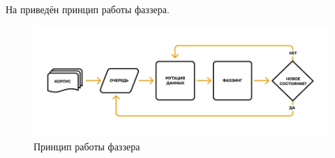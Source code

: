 \newpage
На  приведён принцип работы фаззера.

\begin{figure}[ht] 
	\center
	\includegraphics [scale=0.8] {my_folder/images/fuzzer_principe}
	\caption{Принцип работы фаззера} 
	\label{fig:fuzzer-works-ch2}  
\end{figure}

%
%
%
	


	
